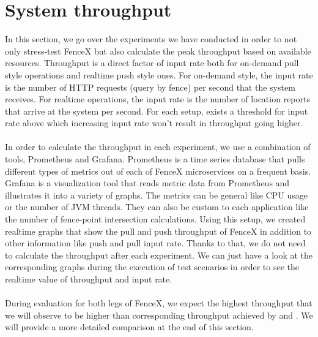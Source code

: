 \documentclass[a4]{report}
\begin{document}
    \section{System throughput}
    In this section, we go over the experiments we have conducted in order to not only stress-test FenceX but also
    calculate the peak throughput based on available resources.
    Throughput is a direct factor of input rate both for on-demand pull style operations and realtime push style ones.
    For on-demand style, the input rate is the number of HTTP requests (query by fence) per second that the system receives.
    For realtime operations, the input rate is the number of location reports that arrive at the system per second.
    For each setup, exists a threshold for input rate above which increasing input rate won't result in throughput going higher.

    \paragraph{}
    In order to calculate the throughput in each experiment, we use a combination of tools, Prometheus and
    Grafana\cite{grafana}.
    Prometheus is a time series database that pulls different types of metrics out of each of FenceX microservices on
    a frequent basis.
    Grafana is a visualization tool that reads metric data from Prometheus and illustrates it into a variety of graphs.
    The metrics can be general like CPU usage or the number of JVM threads.
    They can also be custom to each application like the number of fence-point intersection calculations.
    Using this setup, we created realtime graphs that show the pull and push throughput of FenceX in addition to other information like push and pull input rate.
    Thanks to that, we do not need to calculate the throughput after each experiment.
    We can just have a look at the corresponding graphs during the execution of test scenarios in order to see the realtime value of throughput and input rate.

    \paragraph{}
    During evaluation for both legs of FenceX, we expect the highest throughput that we will observe to be higher
    than corresponding throughput achieved by \cite{Nechifor_Comnac_2013} and
    \cite{Cirillo-Jacobs-Martin-Szczytowski-2014}.
    We will provide a more detailed comparison at the end of this section.
\end{document}
